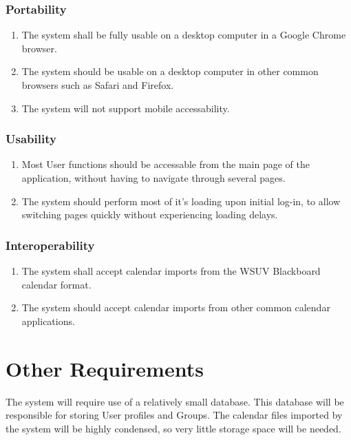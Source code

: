 \documentclass{scrreprt}
\begin{document}
\subsection{Portability}
\begin{enumerate}
\item The system shall be fully usable on a desktop computer in a Google Chrome
browser.
\item The system should be usable on a desktop computer in other common browsers
such as Safari and Firefox.
\item The system will not support mobile accessability.
\end{enumerate}

\subsection{Usability}
\begin{enumerate}
\item Most User functions should be accessable from the main page of the application,
without having to navigate through several pages.
\item The system should perform most of it's loading upon initial log-in, to allow
switching pages quickly without experiencing loading delays.
\end{enumerate}

\subsection{Interoperability}
\begin{enumerate}
\item The system shall accept calendar imports from the WSUV Blackboard calendar
format.
\item The system should accept calendar imports from other common calendar
applications.
\end{enumerate}

\chapter{Other Requirements}
The system will require use of a relatively small database. This database will be responsible for storing User profiles and Groups. The calendar files imported by the system will be highly condensed, so very little storage space will be needed.
\end{document}
